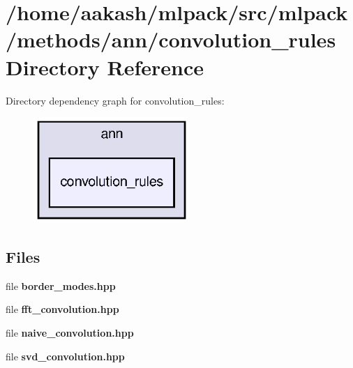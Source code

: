 \section{/home/aakash/mlpack/src/mlpack/methods/ann/convolution\+\_\+rules Directory Reference}
\label{dir_64bc63d1017c5e75bed2c1b83e1d3fb2}
Directory dependency graph for convolution\+\_\+rules\+:
\nopagebreak
\begin{figure}[H]
\begin{center}
\leavevmode
\includegraphics[width=168pt]{dir_64bc63d1017c5e75bed2c1b83e1d3fb2_dep}
\end{center}
\end{figure}
\subsection*{Files}
\begin{DoxyCompactItemize}
\item 
file \textbf{ border\+\_\+modes.\+hpp}
\item 
file \textbf{ fft\+\_\+convolution.\+hpp}
\item 
file \textbf{ naive\+\_\+convolution.\+hpp}
\item 
file \textbf{ svd\+\_\+convolution.\+hpp}
\end{DoxyCompactItemize}
